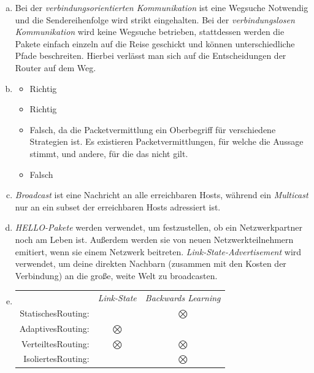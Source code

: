 
\begin{enumerate}[a)]

\item Bei der \textit{verbindungsorientierten Kommunikation} ist eine Wegsuche Notwendig und die Sendereihenfolge wird strikt eingehalten. Bei der \textit{verbindungslosen Kommunikation} wird keine Wegsuche betrieben, stattdessen werden die Pakete einfach einzeln auf die Reise geschickt und können unterschiedliche Pfade beschreiten. Hierbei verlässt man sich auf die Entscheidungen der Router auf dem Weg.
\item 
	\begin{itemize}
		\item Richtig
		\item Richtig
		\item Falsch, da die Packetvermittlung ein Oberbegriff für verschiedene Strategien ist. Es existieren Packetvermittlungen, für welche die Aussage stimmt, und andere, für die das nicht gilt.
		\item Falsch
	\end{itemize}

\item \textit{Broadcast} ist eine Nachricht an alle erreichbaren Hosts, während ein \textit{Multicast} nur an ein subset der erreichbaren Hosts adressiert ist.
\item \textit{HELLO-Pakete} werden verwendet, um festzustellen, ob ein Netzwerkpartner noch am Leben ist. Außerdem werden sie von neuen Netzwerkteilnehmern emitiert, wenn sie einem Netzwerk beitreten. \textit{Link-State-Advertisement} wird verwendet, um deine direkten Nachbarn (zusammen mit den Kosten der Verbindung) an die große, weite Welt zu broadcasten.
\item
	\begin{tabular}{r c c}
					& \textit{Link-State} & \textit{Backwards Learning} \\
		StatischesRouting: & \bigcirc     & $\bigotimes$ \\
		AdaptivesRouting:  & $\bigotimes$ & \bigcirc \\
		VerteiltesRouting: & $\bigotimes$ & $\bigotimes$ \\
		IsoliertesRouting: & \bigcirc     & $\bigotimes$ \\
	\end{tabular}

\end{enumerate}





